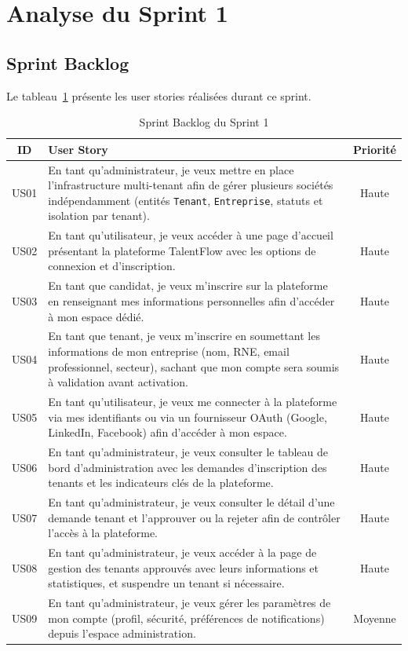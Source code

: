 \section{Analyse du Sprint 1}

\subsection{Sprint Backlog}

Le tableau~\ref{tab:backlog_s1} présente les user stories réalisées durant ce sprint.

\begin{table}[h]
\centering
\renewcommand{\arraystretch}{1.4}
\begin{tabular}{|c|p{8.5cm}|c|}
\hline
\textbf{ID} & \textbf{User Story} & \textbf{Priorité} \\
\hline
US01 & En tant qu'administrateur, je veux mettre en place l'infrastructure multi-tenant
afin de gérer plusieurs sociétés indépendamment (entités \texttt{Tenant}, \texttt{Entreprise},
statuts et isolation par tenant). & Haute \\
\hline
US02 & En tant qu'utilisateur, je veux accéder à une page d'accueil présentant la
plateforme TalentFlow avec les options de connexion et d'inscription. & Haute \\
\hline
US03 & En tant que candidat, je veux m'inscrire sur la plateforme en renseignant mes
informations personnelles afin d'accéder à mon espace dédié. & Haute \\
\hline
US04 & En tant que tenant, je veux m'inscrire en soumettant les informations de mon
entreprise (nom, RNE, email professionnel, secteur), sachant que mon compte sera soumis
à validation avant activation. & Haute \\
\hline
US05 & En tant qu'utilisateur, je veux me connecter à la plateforme via mes identifiants
ou via un fournisseur OAuth (Google, LinkedIn, Facebook) afin d'accéder à mon espace. & Haute \\
\hline
US06 & En tant qu'administrateur, je veux consulter le tableau de bord d'administration
avec les demandes d'inscription des tenants et les indicateurs clés de la plateforme. & Haute \\
\hline
US07 & En tant qu'administrateur, je veux consulter le détail d'une demande tenant et
l'approuver ou la rejeter afin de contrôler l'accès à la plateforme. & Haute \\
\hline
US08 & En tant qu'administrateur, je veux accéder à la page de gestion des tenants
approuvés avec leurs informations et statistiques, et suspendre un tenant si nécessaire. & Haute \\
\hline
US09 & En tant qu'administrateur, je veux gérer les paramètres de mon compte (profil,
sécurité, préférences de notifications) depuis l'espace administration. & Moyenne \\
\hline
\end{tabular}
\caption{Sprint Backlog du Sprint 1}
\label{tab:backlog_s1}
\end{table}

